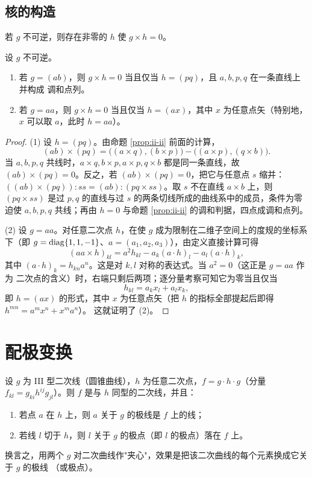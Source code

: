 \subsection{核的构造}

若 $g$ 不可逆，则存在非零的 $h$ 使 $g\times h=0$。

\begin{proposition}
\label{prop:kernel}
设 $g$ 不可逆。
\begin{enumerate}[label=(\arabic*),itemsep=2pt]
  \item 若 $g=(ab)$，则 $g\times h=0$ 当且仅当 $h=(pq)$，且 $a,b,p,q$ 在一条直线上并构成
        调和点列。
  \item 若 $g=aa$，则 $g\times h=0$ 当且仅当 $h=(ax)$，其中 $x$ 为任意点矢（特别地，
        $x$ 可以取 $a$，此时 $h=aa$）。
\end{enumerate}
\end{proposition}

\begin{proof}
(1) 设 $h=(pq)$。由命题 \ref{prop:ii-ii} 前面的计算，
\[
(ab)\times(pq)=\big((a\times q),(b\times p)\big)-\big((a\times p),(q\times b)\big).
\]
当 $a,b,p,q$ 共线时，$a\times q,b\times p,a\times p,q\times b$ 都是同一条直线，故
$(ab)\times(pq)=0$。反之，若 $(ab)\times(pq)=0$，把它与任意点 $s$ 缩并：
$((ab)\times(pq)):ss=(ab):(pq\times ss)$。取 $s$ 不在直线 $a\times b$ 上，则
$(pq\times ss)$ 是过 $p,q$ 的直线与过 $s$ 的两条切线所成的曲线系中的成员，条件为零迫使
$a,b,p,q$ 共线；再由 $h=0$ 与命题 \ref{prop:ii-ii} 的调和判据，四点成调和点列。

(2) 设 $g=aa$。对任意二次点 $h$，在使 $g$ 成为限制在二维子空间上的度规的坐标系下（即
$g=\operatorname{diag}\{1,1,-1\}$、$a=(a_1,a_2,a_3)$），由定义直接计算可得
\[
(aa\times h)_{kl}=a^2h_{kl}-a_k(a\cdot h)_l-a_l(a\cdot h)_k ,
\]
其中 $(a\cdot h)_k=h_{kn}a^n$。这是对 $k,l$ 对称的表达式。当 $a^2=0$（这正是 $g=aa$ 作为
二次点的含义）时，右端只剩后两项；逐分量考察可知它为零当且仅当
\[
h_{kl}=a_kx_l+a_lx_k ,
\]
即 $h=(ax)$ 的形式，其中 $x$ 为任意点矢（把 $h$ 的指标全部提起后即得 $h^{mn}=a^mx^n+x^ma^n$）。
这就证明了 (2)。
\end{proof}

\section{配极变换}

\begin{proposition}
设 $g$ 为 III 型二次线（圆锥曲线），$h$ 为任意二次点，$f=g\cdot h\cdot g$（分量
$f_{kl}=g_{ki}h^{ij}g_{jl}$）。则 $f$ 是与 $h$ 同型的二次线，并且：
\begin{enumerate}[label=(\roman*),itemsep=2pt]
  \item 若点 $a$ 在 $h$ 上，则 $a$ 关于 $g$ 的极线是 $f$ 上的线；
  \item 若线 $l$ 切于 $h$，则 $l$ 关于 $g$ 的极点（即 $l$ 的极点）落在 $f$ 上。
\end{enumerate}
换言之，用两个 $g$ 对二次曲线作"夹心"，效果是把该二次曲线的每个元素换成它关于 $g$ 的极线
（或极点）。
\end{proposition}


